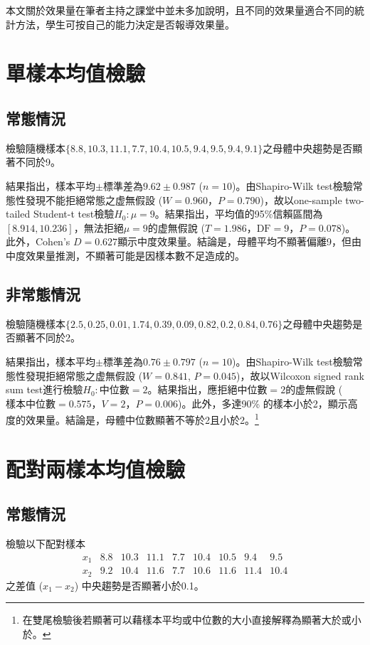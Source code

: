 \documentclass[12pt]{article}
\begin{document}
本文關於效果量在筆者主持之課堂中並未多加說明，且不同的效果量適合不同的統計方法，學生可按自己的能力決定是否報導效果量。


\section{單樣本均值檢驗}
\subsection{常態情況}
檢驗隨機樣本$\{8.8, 10.3, 11.1, 7.7, 10.4, 10.5, 9.4, 9.5, 9.4, 9.1\}$之母體中央趨勢是否顯著不同於9。

結果指出，樣本平均$\pm$標準差為$9.62 \pm 0.987$ ($n = 10$)。由Shapiro-Wilk test檢驗常態性發現不能拒絕常態之虚無假設 ($W = 0.960$，$P = 0.790$)，故以one-sample two-tailed Student-t test檢驗$H_0: \mu=9$。結果指出，平均值的95\%信賴區間為$\left[8.914, 10.236\right]$，無法拒絕$\mu = 9$的虚無假說 ($T = 1.986$，$\text{DF} = 9$，$P = 0.078$)。此外，Cohen's $D = 0.627$顯示中度效果量。結論是，母體平均不顯著偏離9，但由中度效果量推測，不顯著可能是因樣本數不足造成的。

\subsection{非常態情況}
檢驗隨機樣本$\{2.5, 0.25, 0.01, 1.74, 0.39, 0.09, 0.82, 0.2, 0.84, 0.76\}$之母體中央趨勢是否顯著不同於2。

結果指出，樣本平均$\pm$標準差為$0.76 \pm 0.797$ ($n = 10$)。由Shapiro-Wilk test檢驗常態性發現拒絕常態之虚無假設 ($W = 0.841$, $P = 0.045$)，故以Wilcoxon signed rank sum test進行檢驗$H_0: \text{中位數}=2$。結果指出，應拒絕中位數$=2$的虚無假說 ($\text{樣本中位數}=0.575$，$V = 2$，$P = 0.006$)。此外，多達90\% 的樣本小於2，顯示高度的效果量。結論是，母體中位數顯著不等於2且小於2。\footnote{在雙尾檢驗後若顯著可以藉樣本平均或中位數的大小直接解釋為顯著大於或小於。}

\section{配對兩樣本均值檢驗}
\subsection{常態情況}
檢驗以下配對樣本
\[
\begin{matrix}
x_1 & 8.8 & 10.3 & 11.1 & 7.7 &10.4 & 10.5 & 9.4 & 9.5 \\
x_2 & 9.2 & 10.4 & 11.6 & 7.7 & 10.6 & 11.6 & 11.4 & 10.4
\end{matrix}
\]
之差值 ($x_1 - x_2$) 中央趨勢是否顯著小於0.1。
\end{document}
